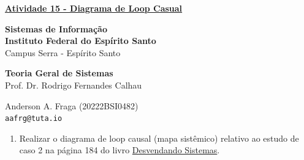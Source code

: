 \documentclass[11pt]{article}
\begin{document}
\underline{\textbf{Atividade 15 - Diagrama de Loop Casual}}\par
\textbf{Sistemas de Informação}\\
\textbf{Instituto Federal do Espírito Santo}\\
Campus Serra - Espírito Santo\par
\textbf{Teoria Geral de Sistemas}\\
Prof. Dr. Rodrigo Fernandes Calhau\par
Anderson A. Fraga (20222BSI0482)\\
\texttt{aafrg@tuta.io}\\  %

\begin{enumerate}
	\item Realizar o diagrama de loop causal (mapa sistêmico) relativo ao estudo de caso 2 na página 184 do livro \href{https://drive.google.com/file/d/1eJU2qK8IzC-S8jRKQuHrIgED1tEvzGOq/view}{Desvendando Sistemas}.


\end{enumerate}
\end{document}
